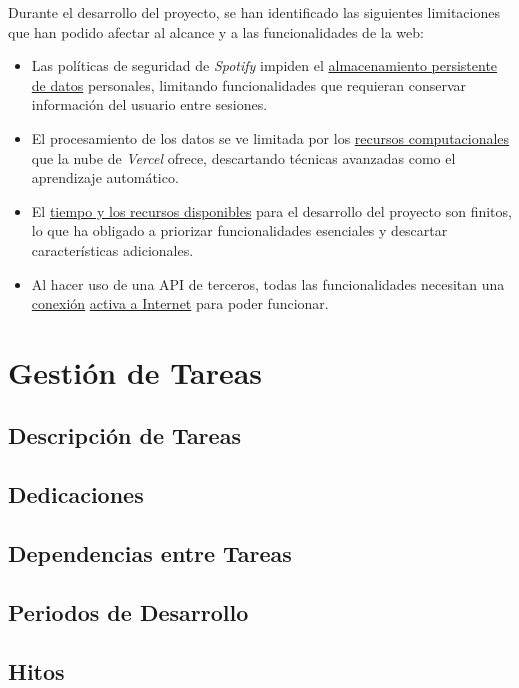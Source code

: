 Durante el desarrollo del proyecto, se han identificado las siguientes limitaciones que han podido afectar al alcance y a las funcionalidades de la web:

\begin{itemize}
    \item Las políticas de seguridad de \textit{Spotify} impiden el \underline{almacenamiento persistente de datos} personales, limitando funcionalidades que requieran conservar información del usuario entre sesiones.

    \item El procesamiento de los datos se ve limitada por los \underline{recursos computacionales} que la nube de \textit{Vercel} ofrece, descartando técnicas avanzadas como el aprendizaje automático.

    \item El \underline{tiempo y los recursos disponibles} para el desarrollo del proyecto son finitos, lo que ha obligado a priorizar funcionalidades esenciales y descartar características adicionales.

    \item Al hacer uso de una API de terceros, todas las funcionalidades necesitan una \underline{conexión} \underline{activa a Internet} para poder funcionar.
\end{itemize}

\section{Gestión de Tareas}
\subsection{Descripción de Tareas}
\subsection{Dedicaciones}
\subsection{Dependencias entre Tareas}
\subsection{Periodos de Desarrollo}
\subsection{Hitos}

